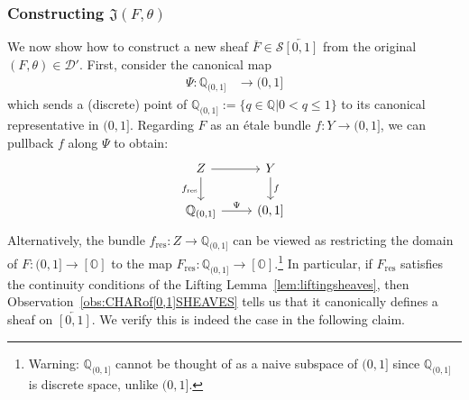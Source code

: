 \documentclass[a4paper, 11pt,reqno]{amsart}
\newcommand{\baseS}{\mathcal{S}}
\newcommand{\D}{\mathcal{D}}
\newcommand{\Q}{\mathbb{Q}}
\newcommand{\J}{\mathfrak{J}}
\newcommand{\qint}{\mathbb{Q}_{(0,1]}}
\begin{document}
\subsubsection*{Constructing $\J(F,\theta)$} We now show how to construct a new sheaf $\overline{F}\in\baseS\overleftarrow{[0,1]}$ from the original $(F,\theta)\in\D'$. First, consider the canonical map 
\begin{align}\label{eq:canonical(0,1]}
\Psi: \qint &\longrightarrow (0,1] %
\end{align} 
which sends a (discrete) point of $\qint:=\{q\in\Q  | 0<q\leq 1\}$ to its canonical representative in $(0,1]$. Regarding $F$ as an \'{e}tale bundle $f\colon Y\to(0,1]$, we can pullback $f$ along $\Psi$ to obtain:
\[\begin{tikzcd}
Z \ar[d,swap,"f_{\text{res}}"] \ar[r] & Y \ar[d,"f"]\\
\protect\mathbb{Q}_{(0,1]} 
\ar[r,"\Psi"] 
& \protect(0,1]
\end{tikzcd}\]
Alternatively, the bundle $f_{\text{res}}\colon Z\rightarrow \mathbb{Q}_{(0,1]}$ can be viewed as restricting the domain of $F\colon (0,1]\rightarrow [\mathbb{O}]$ to the map $F_{\text{res}}\colon \mathbb{Q}_{(0,1]}\rightarrow [\mathbb{O}]$.\footnote{Warning: $\mathbb{Q}_{(0,1]}$ cannot be thought of as a naive subspace of $(0,1]$ since $\mathbb{Q}_{(0,1]}$ is discrete space, unlike $(0,1]$.} In particular, if $F_{\text{res}}$ satisfies the continuity conditions of the Lifting Lemma~\ref{lem:liftingsheaves}, then Observation~\ref{obs:CHARof[0,1]SHEAVES} tells us that
it canonically defines a sheaf on $\overleftarrow{[0,1]}$. We verify this is indeed the case in the following claim.
\end{document}
